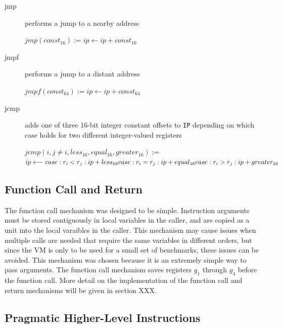 \documentclass[english,a4paper,12pt]{report}
\begin{document}
\begin{description}
	\item[jmp] performs a jump to a nearby address
	
	$jmp(const_{16}) := ip \longleftarrow ip + const_{16}$ \\
	\item[jmpf] performs a jump to a distant address
	
	$jmpf(const_{64}) := ip \longleftarrow ip + const_{64}$ \\	
	
	\item[jcmp] adds one of three 16-bit integer constant offsets to
	\verb|IP| depending on which case holds for two different
	integer-valued registers
	
	$jcmp(i, j\neq i,less_{16},equal_{16},greater_{16}) :=$ \\
	$ ip \longleftarrow  \\
	case :r_{i} < r_{j}: ip + less_{16}   \\
	case :r_{i} = r_{j}: ip + equal_{16} \\
	case :r_{i} > r_{j}: ip + greater_{16}$ \\
\end{description}


\subsection{Function Call and Return}

The function call mechanism was designed to be simple. Instruction
arguments must be stored contiguously in local variables in the
caller, and are copied as a unit into the local varaibles in the
caller. This mechanism may cause issues when multiple calls are needed
that require the same variables in different orders, but since the VM
is only to be used for a small set of benchmarks, these issues can be
avoided. This mechanism was chosen because it is an extremely simple
way to pass arguments. The function call mechanism saves registers
$g_1$ through $g_4$ before the function call. More detail on the
implementation of the function call and return mechanisms will be
given in section XXX.



\subsection{Pragmatic Higher-Level Instructions}
\end{document}
